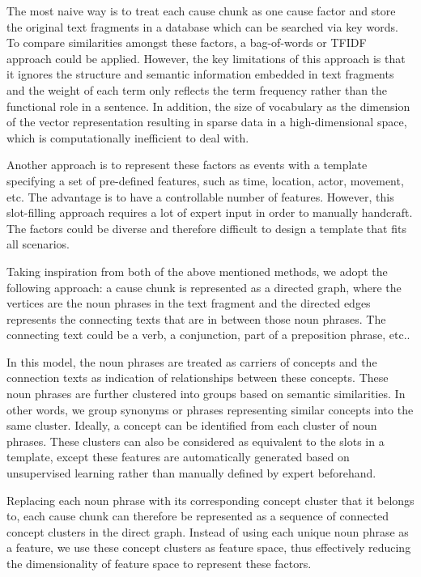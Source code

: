 \documentclass [
     12pt,         %
     a4paper,      %
     BCOR10mm,     %
     DIV14,        %
     liststotoc,   %
     bibtotoc,     %
     idxtotoc,     %
     parskip       %
     ]{scrreprt}
\begin{document}
The most naive way is to treat each cause chunk as one cause factor and store the original text fragments in a database which can be searched via key words. To compare similarities amongst these factors, a bag-of-words or TFIDF approach could be applied. However, the key limitations of this approach is that it ignores the structure and semantic information embedded in text fragments and the weight of each term only reflects the term frequency rather than the functional role in a sentence. In addition, the size of vocabulary as the dimension of the vector representation resulting in sparse data in a high-dimensional space, which is computationally inefficient to deal with.  

Another approach is to represent these factors as events with a template specifying a set of pre-defined features, such as time, location, actor, movement, etc. The advantage is to have a controllable number of features. However, this slot-filling approach requires a lot of expert input in order to manually handcraft. The factors could be diverse and therefore difficult to design a template that fits all scenarios.   

Taking inspiration from both of the above mentioned methods, we adopt the following approach: a cause chunk is represented as a directed graph, where the vertices are the noun phrases in the text fragment and the directed edges represents the connecting texts that are in between those noun phrases. The connecting text could be a verb, a conjunction, part of a preposition phrase, etc.. 

In this model, the noun phrases are treated as carriers of concepts and the connection texts as indication of relationships between these concepts. These noun phrases are further clustered into groups based on semantic similarities. In other words, we group synonyms or phrases representing similar concepts into the same cluster. Ideally, a concept can be identified from each cluster of noun phrases. These clusters can also be considered as equivalent to the slots in a template, except these features are automatically generated based on unsupervised learning rather than manually defined by expert beforehand. 

Replacing each noun phrase with its corresponding concept cluster that it belongs to, each cause chunk can therefore be represented as a sequence of connected concept clusters in the direct graph. Instead of using each unique noun phrase as a feature, we use these concept clusters as feature space, thus effectively reducing the dimensionality of feature space to represent these factors. 
\end{document}

